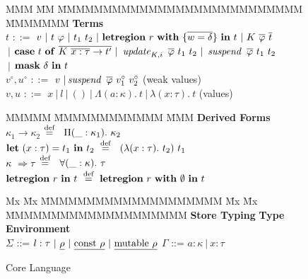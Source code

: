 \begin{figure}[ht]
\begin{flushleft}
\begin{tabbing}
MMM 	\= MM \= MMMMMMMMMMMMMMMMMMMMMMMMMMM \= MMMMMMM \kill
\textbf{Terms} \\
$t$ 	\> $::=$ 	\> $v \
				| \ t \ \varphi \
				| \ t_1 \ t_2 \
				| \ \kletregion \ r \ \kwith \ \{ \ov{w = \delta} \} \ \kin \ t \
				| \ K \ \ov{\varphi} \ \ov{t}$
\\
	\> $\ |$	\> $\textrm{\textbf{case}} \ t \ \textrm{\textbf{of}} \ \overline{K \ \overline{x : \tau} \to t' } \
				| \ \operatorname{\mathit{update}}_{K,i} \ \overline{\varphi} \ t_1 \ t_2 \
				| \ \operatorname{\mathit{suspend}} \ \overline{\varphi} \ t_1 \ t_2$ \\
	\> $\ |$	\> $\textrm{\textbf{mask}} \ \delta \ \textrm{\textbf{in}} \ t$
\\[1ex]
$v^\circ,u^\circ$ 
	\> $::=$	\> $v \
				| \isuspend \ \ov{\varphi} \ v_1^\circ \ v_2^\circ$
			\> (weak values)
\\
$v,u$	\> $::=$	\> $x \ 
				| \ l \
				| \ () \
				| \ \Lambda (a : \kappa). \ t \
				| \ \lambda (x : \tau). \ t$
			\> (values)
\end{tabbing}


\begin{tabbing}
MMMMM	\= MMMMMMMMMMMM \= MMM \kill
\textbf{Derived Forms} 
\\
$\kappa_1 \to \kappa_2$		\> $\equalsdef \ \ \Pi     (\_ : \kappa_1). \ \kappa_2$ 
\>
$\klet \ (x : \tau) = t_1 \ \kin \ t_2 \ \equalsdef \ \ (\lambda (x : \tau). \ t_2) \ t_1$
\\
$\kappa \ \Rightarrow \tau$		\> $\equalsdef \ \ \forall (\_ : \kappa).   \ \tau$
\>
$\kletregion \ r \ \kin \ t \ \equalsdef \ \kletregion \ r \ \kwith \ \emptyset \ \kin \ t$
\end{tabbing}
\begin{tabbing}
Mx 	\= Mx \= MMMMMMMMMMMMMMMMMMMM \= Mx 
	\= Mx \= MMMMMMMMMMMMMMMMMMMM \kill
	\textbf{Store Typing}
		\> \> \> \textbf{Type Environment} \\
	$\Sigma$	\> ::= $l : \tau \
					| \ \underline{\rho} \
					| \ \underline{\textrm{const} \ \rho} \
					| \ \underline{\textrm{mutable} \ \rho}$
\>	\> $\Gamma$	\> ::=	$a : \kappa \ | \ x : \tau$
\end{tabbing}

\end{flushleft}
\caption{Core Language}
\label{fig:core-language}
\end{figure}
